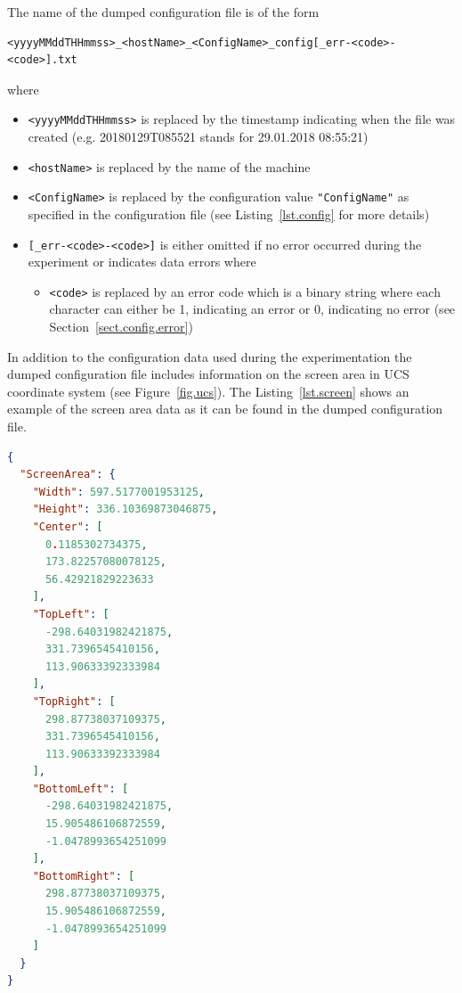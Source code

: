 \documentclass[a4paper,oneside]{book}
\begin{document}
The name of the dumped configuration file is of the form
\begin{lstlisting}
<yyyyMMddTHHmmss>_<hostName>_<ConfigName>_config[_err-<code>-<code>].txt
\end{lstlisting}
where
\begin{itemize}
    \item \texttt{<yyyyMMddTHHmmss>} is replaced by the timestamp indicating when the file was created (e.g. 20180129T085521 stands for 29.01.2018 08:55:21)
    \item \texttt{<hostName>} is replaced by the name of the machine
    \item \texttt{<ConfigName>} is replaced by the configuration value \texttt{"ConfigName"} as specified in the configuration file (see Listing~\ref{lst.config} for more details)
    \item \texttt{[\_err-<code>-<code>]} is either omitted if no error occurred during the experiment or indicates data errors where
        \begin{itemize}
            \item \texttt{<code>} is replaced by an error code which is a binary string where each character can either be 1, indicating an error or 0, indicating no error (see Section~\ref{sect.config.error})
        \end{itemize}
\end{itemize}

In addition to the configuration data used during the experimentation the dumped configuration file includes information on the screen area in UCS coordinate system (see Figure~\ref{fig.ucs}).
The Listing~\ref{lst.screen} shows an example of the screen area data as it can be found in the dumped configuration file.

\begin{lstlisting}[language=json, caption={Screen Area Data in Dumped Config}, label=lst.screen]
{
  "ScreenArea": {
    "Width": 597.5177001953125,
    "Height": 336.10369873046875,
    "Center": [
      0.1185302734375,
      173.82257080078125,
      56.42921829223633
    ],
    "TopLeft": [
      -298.64031982421875,
      331.7396545410156,
      113.90633392333984
    ],
    "TopRight": [
      298.87738037109375,
      331.7396545410156,
      113.90633392333984
    ],
    "BottomLeft": [
      -298.64031982421875,
      15.905486106872559,
      -1.0478993654251099
    ],
    "BottomRight": [
      298.87738037109375,
      15.905486106872559,
      -1.0478993654251099
    ]
  }
}
\end{lstlisting}
\end{document}
